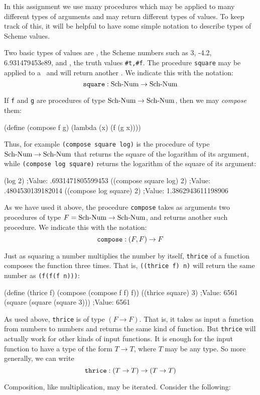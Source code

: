 In this assignment we use many procedures which may be applied to many
different types of arguments and may return different types of values.  To
keep track of this, it will be helpful to have some simple notation to
describe types of Scheme values.

Two basic types of values are \SN, the Scheme numbers such as 3,
-4.2, 6.931479453e89, and \SB, the truth values {\tt \#t,\#f}.
The procedure {\tt square} may be applied to a \SN\ and will return
another \SN.  We indicate this with the notation:
\[{\tt square} : \SN \to \SN \]

If {\tt f} and {\tt g}  are procedures of type $\SN \to \SN$, then we may
{\em compose} them:

\beginlisp
(define (compose f g)
  (lambda (x)
    (f (g x))))
\endlisp

\noindent
Thus, for example {\tt (compose square log)} is the procedure of type $\SN
\to \SN$ that returns the square of the logarithm of its argument, while
{\tt (compose log square)} returns the logarithm of the square of its
argument:

\beginlisp
(log 2)
;Value: .6931471805599453
\null
((compose square log) 2)
;Value: .4804530139182014
\null
((compose log square) 2)
;Value: 1.3862943611198906
\endlisp

\noindent
As we have used it above, the procedure {\tt compose} takes as arguments
two procedures of type $F = \SN \to \SN$, and returns another such
procedure.  We indicate this with the notation:
\[{\tt compose} : (F, F) \to F\]

Just as squaring a number multiplies the number by itself, {\tt thrice} of
a function composes the function three times.  That is, {\tt ((thrice f)
n)} will return the same number as {\tt (f(f(f n)))}:

\beginlisp
(define (thrice f)
  (compose (compose f f) f))
\null
((thrice square) 3)
;Value: 6561
\null
(square (square (square 3)))
;Value: 6561
\endlisp

As used above, {\tt thrice} is of type $(F \to F)$.  That is, it takes as
input a function from numbers to numbers and returns the same kind of
function.  But {\tt thrice} will actually work for other kinds of input
functions.  It is enough for the input function to have a type of the form
$T\to T$, where $T$ may be any type.  So more generally, we can write
\[\hbox{\tt thrice} : (T\to T) \to (T\to T) \]

Composition, like multiplication, may be iterated.  Consider
the following:

